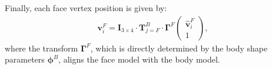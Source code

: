 Finally, each face vertex position is given by:
\begin{align}
\mathbf{v}^F_i = \mathbf{I}_{3\times 4} \cdot \mathbf{T}^B_{j=F} \cdot \mathbf{\Gamma}^F \begin{pmatrix} \hat{\mathbf{v}}^F_i \\ 1 \end{pmatrix},
\label{eq:face_pose}
\end{align}
where the transform $\mathbf{\Gamma}^F$, which is directly determined by the body shape parameters $\boldsymbol{\phi}^B$, aligns the face model with the body model.

%
